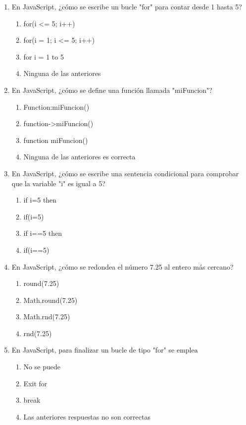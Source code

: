 \documentclass[addpoints, 12]{exam}
\begin{document}
\begin{enumerate}
\item En JavaScript, ¿cómo se escribe un bucle "for" para contar desde 1 hasta 5?

\begin{enumerate}
\item for(i <= 5; i++)
\item for(i = 1; i <= 5; i++)
\item for i = 1 to 5
\item Ninguna de las anteriores
\end{enumerate}

\item En JavaScript, ¿cómo se define una función llamada "miFuncion"?

\begin{enumerate}
\item Function:miFuncion()
\item function->miFuncion()
\item function miFuncion()
\item Ninguna de las anteriores es correcta
\end{enumerate}

\item En JavaScript, ¿cómo se escribe una sentencia condicional para comprobar que la variable "i" es igual a 5?

\begin{enumerate}
\item if i=5 then
\item if(i=5)
\item if i==5 then
\item if(i==5)
\end{enumerate}

\item En JavaScript, ¿cómo se redondea el número 7.25 al entero más cercano?

\begin{enumerate}
\item round(7.25)
\item Math.round(7.25)
\item Math.rnd(7.25)
\item rnd(7.25)
\end{enumerate}

\item En JavaScript, para finalizar un bucle de tipo "for" se emplea

\begin{enumerate}
\item No se puede
\item Exit for
\item break
\item Las anteriores respuestas no son correctas
\end{enumerate}


\end{enumerate}
\end{document}
